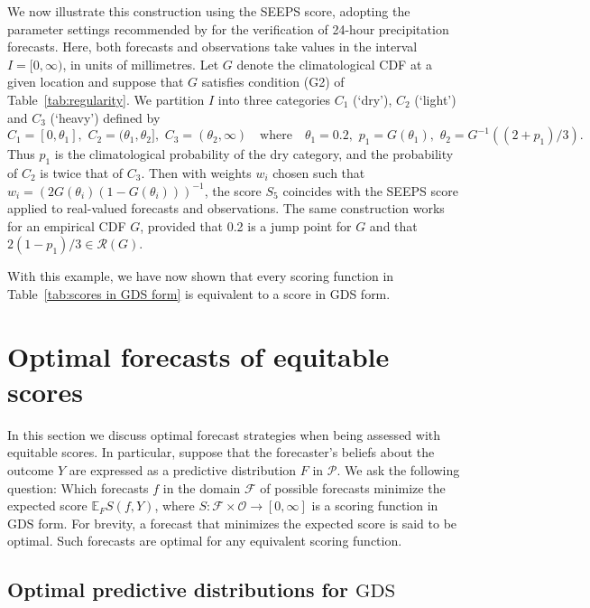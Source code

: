 \documentclass[10pt]{article} %
\theoremstyle{theorem}
\theoremstyle{definition}
\newcommand{\EEE}{\mathbb{E}}
\newcommand{\GDS}{\mathrm{GDS}}
\newcommand{\RG}{\mathcal{R}(G)}
\begin{document}
We now illustrate this construction using the SEEPS score, adopting the parameter settings recommended by \citet{rodwell2010new} for the verification of 24-hour precipitation forecasts. Here, both forecasts and observations take values in the interval $I=[0,\infty)$, in units of millimetres. Let $G$ denote the climatological CDF at a given location and suppose that $G$ satisfies condition (G2) of Table~\ref{tab:regularity}.
We partition $I$ into three categories $C_1$ (`dry'), $C_2$ (`light') and $C_3$ (`heavy') defined by
\begin{equation}\label{eq:SEEPS categories}
C_1 = [0,\theta_1], \,\, C_2 = (\theta_1,\theta_2],  \,\, C_3 = (\theta_2,\infty) \quad\text{where}\quad \theta_1=0.2, \,\, p_1 = G(\theta_1),\,\, \theta_2 = G^{-1}((2+p_1)/3).
\end{equation}
Thus $p_1$ is the climatological probability of the dry category, and the probability of $C_2$ is twice that of $C_3$. Then with weights $w_i$ chosen such that $w_i=(2 G(\theta_i) (1-G(\theta_i)))^{-1}$, the score $S_5$ coincides with the SEEPS score applied to real-valued forecasts and observations. The same construction works for an empirical CDF $G$, provided that 0.2 is a jump point for $G$ and that $2(1-p_1)/3 \in\RG$.

With this example, we have now shown that every scoring function in Table~\ref{tab:scores in GDS form} is equivalent to a score in GDS form.


\section{Optimal forecasts of equitable scores}\label{s:optimal}

In this section we discuss optimal forecast strategies when being assessed with equitable scores. In particular, suppose that the forecaster's beliefs about the outcome $Y$ are expressed as a predictive distribution $F$ in $\mathcal{P}$. We ask the following question: Which forecasts $f$ in the domain $\mathcal{F}$ of possible forecasts minimize the expected score $\EEE_F S(f,Y)$, where $S:\mathcal{F}\times\mathcal{O}\to[0,\infty]$ is a scoring function in $\GDS$ form. For brevity, a forecast that minimizes the expected score is said to be optimal. Such forecasts are optimal for any equivalent scoring function.

\subsection{Optimal predictive distributions for $\GDS$}\label{ss:optimal GDS}
\end{document}
